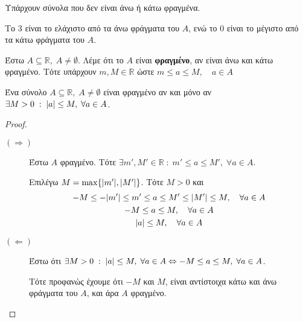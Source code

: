 \begin{rem}
\item {}
  \begin{myitemize}
    \item Υπάρχουν σύνολα που δεν είναι άνω ή κάτω φραγμένα.
    \item Το  $ 3 $ είναι το ελάχιστο από τα άνω φράγματα του $A$, ενώ το $ 0
      $ είναι το μέγιστο από τα κάτω φράγματα του $A$. 
  \end{myitemize}
\end{rem}


\begin{mybox1}
\begin{dfn}
  Έστω $ A \subseteq \mathbb{R}, \; A \neq \emptyset $. Λέμε ότι το $A$ 
  είναι \textbf{φραγμένο}, αν είναι άνω και κάτω φραγμένο. 
  Τότε υπάρχουν $ m,M \in \mathbb{R} $ ώστε $ m \leq a \leq M, \quad a \in A $ 
\end{dfn}
\end{mybox1}

\begin{mybox3}
\begin{prop}
  Ένα σύνολο $ A \subseteq \mathbb{R}, \; A \neq \emptyset $ είναι 
  φραγμένο αν και μόνο αν $ \exists M>0 \; : \; \abs{a} \leq M, \; 
  \forall a \in A$.
\end{prop}
\end{mybox3}
\begin{proof}
\item {}
  \begin{description}
    \item [$ (\Rightarrow) $] Έστω $A$ φραγμένο. Τότε 
      $ \exists m',M' \in \mathbb{R} \; : \; m' \leq a \leq M', \; 
      \forall a \in A $.

      Επιλέγω $ M = \max \{ \abs{m'}, \abs{M'} \} $. Τότε $ M >0 $ και 
      \begin{gather*}
        -M \leq - \abs{m'} \leq m' \leq a \leq M' \leq \abs{M'} 
        \leq M, \quad \forall a \in A \\
        -M \leq a \leq M, \quad \forall a \in A \\
        \abs{a} \leq M, \quad \forall a \in A
      \end{gather*}

    \item [$ (\Leftarrow) $]
      Έστω ότι $ \exists M>0 \; : \; \abs{a} \leq M, \; \forall a \in 
      A \Leftrightarrow -M \leq a \leq M, \; \forall a \in A$. 

      Τότε προφανώς έχουμε ότι $-M $ και $ M $, 
      είναι αντίστοιχα κάτω  και άνω  φράγματα του $A$, και άρα $A$ 
      φραγμένο.
  \end{description} 
\end{proof}

